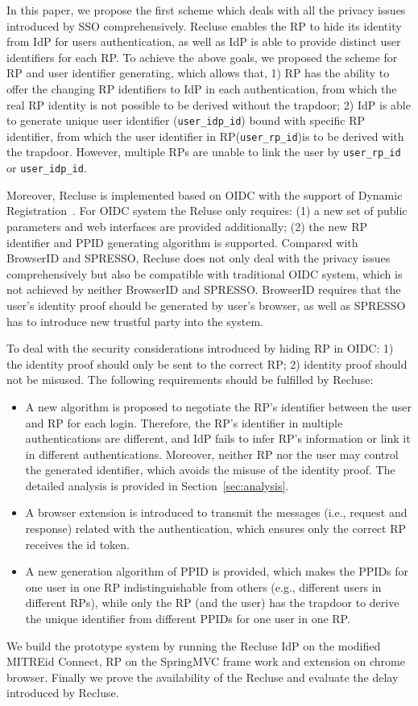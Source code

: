 In this paper, we propose the first scheme which deals with all the privacy issues introduced by SSO comprehensively. Recluse enables the RP to hide its identity from IdP for users authentication, as well as IdP is able to provide distinct user identifiers for each RP. To achieve the above goals, we  proposed the scheme for RP and user identifier generating, which allows that, 1) RP has the ability to offer the changing RP identifiers to IdP in each authentication, from which the real RP identity is not possible to be derived without the trapdoor; 2) IdP is able to generate unique user identifier (\verb+user_idp_id+) bound with specific RP identifier, from which the user identifier in RP(\verb+user_rp_id+)is to be derived with the trapdoor. However, multiple RPs are unable to link the user by \verb+user_rp_id+ or \verb+user_idp_id+.

Moreover, Recluse is implemented based on OIDC with the support of Dynamic Registration~\cite{DynamicRegistration}. For OIDC system the Reluse only requires: (1) a new set of public parameters and web interfaces are provided additionally; (2) the new RP identifier and PPID generating algorithm is supported.
Compared with BrowserID and SPRESSO, Recluse does not only deal with the privacy issues comprehensively but also be compatible with traditional OIDC system, which is not achieved by neither BrowserID and SPRESSO. BrowserID requires that the user's identity proof should be generated by user's browser, as well as SPRESSO has to introduce new trustful party into the system.

To deal with the security considerations introduced by hiding RP in OIDC: 1) the identity proof should only be sent to the correct RP; 2) identity proof should not be misused. The following requirements should be fulfilled by Recluse:
\begin{itemize}
\item A new algorithm is proposed to negotiate the RP's identifier between the user and RP for each login. Therefore, the RP's identifier in multiple authentications are different, and IdP fails to infer RP's information or link it in different authentications. Moreover, neither RP nor the user may control the generated identifier, which avoids the misuse of the identity proof. The detailed analysis is provided in Section~\ref{sec:analysis}.
\item A browser extension is introduced to transmit the messages (i.e.,  request and response) related with the authentication, which ensures only the correct RP receives the id token.
\item A new generation algorithm of PPID is provided, which makes the PPIDs for one user in one RP  indistinguishable  from others (e.g., different users in different RPs), while only the RP (and the user) has the trapdoor to derive the unique identifier from different PPIDs for one user in one RP.
\end{itemize}
We build the prototype system by running the Recluse IdP on the modified MITREid Connect, RP on the SpringMVC frame work and extension on chrome browser. Finally we prove the availability of the Recluse and evaluate the delay introduced by Recluse.


